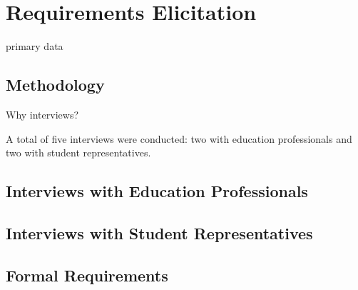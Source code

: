 \chapter{Requirements Elicitation}

primary data

\section{Methodology}

Why interviews?

A total of five interviews were conducted: two with education professionals and two with student representatives.

\section{Interviews with Education Professionals}


\section{Interviews with Student Representatives}

\section{Formal Requirements}